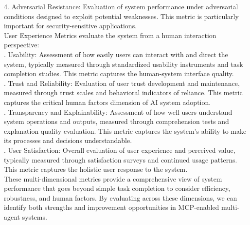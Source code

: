 4. Adversarial Resistance: Evaluation of system performance under adversarial conditions designed to exploit potential weaknesses. This metric is particularly important for security-sensitive applications.\\ \newline
User Experience Metrics evaluate the system from a human interaction perspective:\\ . Usability: Assessment of how easily users can interact with and direct the system, typically measured through standardized usability instruments and task completion studies. This metric captures the human-system interface quality.\\ . Trust and Reliability: Evaluation of user trust development and maintenance, measured through trust scales and behavioral indicators of reliance. This metric captures the critical human factors dimension of AI system adoption.\\ . Transparency and Explainability: Assessment of how well users understand system operations and outputs, measured through comprehension tests and explanation quality evaluation. This metric captures the system's ability to make its processes and decisions understandable.\\ . User Satisfaction: Overall evaluation of user experience and perceived value, typically measured through satisfaction surveys and continued usage patterns. This metric captures the holistic user response to the system.\\ \newline
These multi-dimensional metrics provide a comprehensive view of system performance that goes beyond simple task completion to consider efficiency, robustness, and human factors. By evaluating across these dimensions, we can identify both strengths and improvement opportunities in MCP-enabled multi-agent systems.\\
